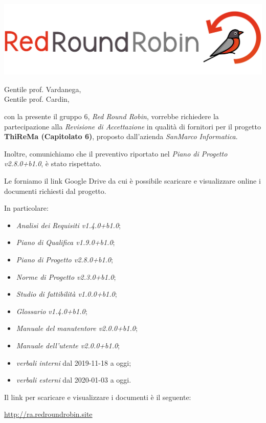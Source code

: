 \documentclass[12pt]{letter}
\date{15 maggio 2020}
\begin{document}
\begin{letter}{ }

\includegraphics[scale=0.17]{images/logo.png}

\opening{Gentile prof. Vardanega,\\ Gentile prof. Cardin, }

con la presente il gruppo 6, \textit{Red Round Robin}, vorrebbe richiedere la partecipazione alla \textit{Revisione di Accettazione} in qualità di fornitori per il progetto \textbf{ThiReMa (Capitolato 6)}, proposto dall'azienda \textit{SanMarco Informatica}.

Inoltre, comunichiamo che il preventivo riportato nel \textit{Piano di Progetto v2.8.0+b1.0}, è stato rispettato.

Le forniamo il link Google Drive da cui è possibile scaricare e visualizzare online i documenti richiesti dal progetto.

In particolare:

\begin{itemize}
  	\item \textit{Analisi dei Requisiti v1.4.0+b1.0};
	\item \textit{Piano di Qualifica v1.9.0+b1.0};
	\item \textit{Piano di Progetto v2.8.0+b1.0};
	\item \textit{Norme di Progetto v2.3.0+b1.0};
	\item \textit{Studio di fattibilità v1.0.0+b1.0};
	\item \textit{Glossario v1.4.0+b1.0};
	\item \textit{Manuale del manutentore v2.0.0+b1.0};
	\item \textit{Manuale dell'utente v2.0.0+b1.0};
	\item \textit{verbali interni} dal 2019-11-18 a oggi;
	\item \textit{verbali esterni} dal 2020-01-03 a oggi.
\end{itemize}

Il link per scaricare e visualizzare i documenti è il seguente:

\begin{center}
\href{https://drive.google.com/drive/folders/1Bgp4GlxOqch6fmSjvgfuCC3z8yf3zROB?usp=sharing}{http://ra.redroundrobin.site}
\end{center}


\end{letter}
\end{document}
